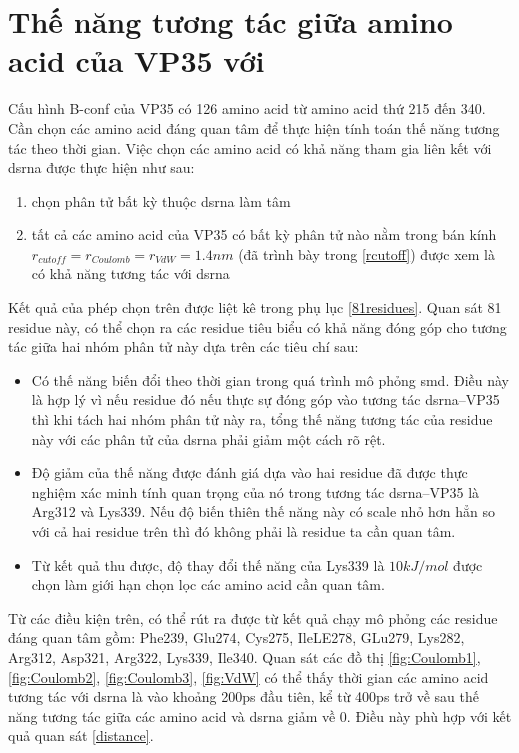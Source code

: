 \documentclass[12pt,a4paper,reqno, oneside]{book}
\begin{document}
\section{Thế năng tương tác giữa amino acid của VP35 với }
\label{potential}
Cấu hình B-conf của VP35 có 126 amino acid từ amino acid thứ 215 đến 340. Cần chọn các amino acid đáng quan tâm để thực hiện tính toán thế năng tương tác theo thời gian. Việc chọn các amino acid có khả năng tham gia liên kết với \gls{dsrna} được thực hiện như sau:
\begin{enumerate}
\item chọn phân tử bất kỳ thuộc \gls{dsrna} làm tâm
\item tất cả các amino acid của VP35 có bất kỳ phân tử nào nằm trong bán kính $r_{cutoff}=r_{Coulomb}=r_{VdW}=1.4nm$ (đã trình bày trong \ref{rcutoff}) được xem là có khả năng tương tác với \gls{dsrna}
\end{enumerate}
Kết quả của phép chọn trên được liệt kê trong phụ lục \ref{81residues}.
Quan sát 81 \gls{residue} này, có thể chọn ra các \gls{residue} tiêu biểu có khả năng đóng góp cho tương tác giữa hai nhóm phân tử này dựa trên các tiêu chí sau:
\begin{itemize}
\item Có thế năng biến đổi theo thời gian trong quá trình mô phỏng \gls{smd}. Điều này là hợp lý vì nếu \gls{residue} đó nếu thực sự đóng góp vào tương tác \gls{dsrna}--VP35 thì khi tách hai nhóm phân tử này ra, tổng thế năng tương tác của \gls{residue} này với các phân tử của \gls{dsrna} phải giảm một cách rõ rệt.
\item Độ giảm của thế năng được đánh giá dựa vào hai \gls{residue} đã được thực nghiệm xác minh tính quan trọng của nó trong tương tác \gls{dsrna}--VP35 là Arg312 và Lys339\cite{Leung2010}. Nếu độ biến thiên thế năng này có scale nhỏ hơn hẳn so với cả hai \gls{residue} trên thì đó không phải là \gls{residue} ta cần quan tâm.
\item Từ kết quả thu được, độ thay đổi thế năng của Lys339 là $10 kJ/mol$ được chọn làm giới hạn chọn lọc các amino acid cần quan tâm.
\end{itemize}
Từ các điều kiện trên, có thể rút ra được từ kết quả chạy mô phỏng các \gls{residue} đáng quan tâm gồm: Phe239, Glu274, Cys275, IleLE278, GLu279, Lys282, Arg312, Asp321, Arg322, Lys339, Ile340. Quan sát các đồ thị \ref{fig:Coulomb1}, \ref{fig:Coulomb2}, \ref{fig:Coulomb3}, \ref{fig:VdW} có thể thấy thời gian các amino acid tương tác với \gls{dsrna} là vào khoảng 200ps đầu tiên, kể từ 400ps trở về sau thế năng tương tác giữa các amino acid và \gls{dsrna} giảm về 0. Điều này phù hợp với kết quả quan sát \ref{distance}.
\end{document}
